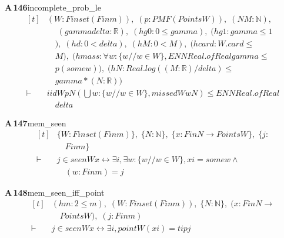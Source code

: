 \documentclass[conference]{IEEEtran}
\theoremstyle{definition}
\newcommand{\lean}[1]{\textsf{\footnotesize #1}}
\begin{document}
\noindent\textbf{A\,146}\quad\lean{incomplete\_prob\_le}
{\footnotesize\[ \begin{aligned}[t]
&(\mathit{W} : \mathit{Finset} (\mathit{Fin} \mathit{m})),\; (\mathit{p} : \mathit{PMF} (\mathit{Points} \mathit{W})),\; (\mathit{N} \mathit{M} : \mathbb{N} ),\\
&\quad \; (\mathit{gamma} \mathit{delta} : \mathbb{R} ),\; (\mathit{hg0} : 0 \leq \mathit{gamma}),\; (\mathit{hg1} : \mathit{gamma} \leq 1\\
&\quad ),\; (\mathit{hd} : 0 < \mathit{delta}),\; (\mathit{hM} : 0 < \mathit{M}),\; (\mathit{hcard} : \mathit{W}.\mathit{card} \leq\\
&\quad \mathit{M}),\; (\mathit{hmass} : \forall \mathit{w} : \{ \mathit{w} // \mathit{w} \in \mathit{W}\} , \mathit{ENNReal}.\mathit{ofReal} \mathit{gamma} \leq\\
&\quad \mathit{p} (\mathit{some} \mathit{w})),\; (\mathit{hN} : \mathit{Real}.\mathit{log} ((\mathit{M}:\mathbb{R} )/\mathit{delta}) \leq\\
&\quad \mathit{gamma}*(\mathit{N}:\mathbb{R} ))\\
\vdash\;&\mathit{iid} \mathit{W} \mathit{p} \mathit{N} (⋃ \mathit{w} : \{ \mathit{w} // \mathit{w} \in \mathit{W}\} , \mathit{missed} \mathit{W} \mathit{w} \mathit{N}) \leq \mathit{ENNReal}.\mathit{ofReal}\\
&\quad \mathit{delta}
\end{aligned} \]}

\noindent\textbf{A\,147}\quad\lean{mem\_seen}
{\footnotesize\[ \begin{aligned}[t]
&\{ \mathit{W} : \mathit{Finset} (\mathit{Fin} \mathit{m})\},\; \{ \mathit{N} : \mathbb{N} \},\; \{ \mathit{x} : \mathit{Fin} \mathit{N} \to \mathit{Points} \mathit{W}\},\; \{ \mathit{j} :\\
&\quad \mathit{Fin} \mathit{m}\}\\
\vdash\;&\mathit{j} \in \mathit{seen} \mathit{W} \mathit{x} \leftrightarrow \exists \mathit{i}, \exists \mathit{w} : \{ \mathit{w} // \mathit{w} \in \mathit{W}\} , \mathit{x} \mathit{i} = \mathit{some} \mathit{w} \wedge\\
&\quad (\mathit{w} : \mathit{Fin} \mathit{m}) = \mathit{j}
\end{aligned} \]}

\noindent\textbf{A\,148}\quad\lean{mem\_seen\_iff\_point}
{\footnotesize\[ \begin{aligned}[t]
&(\mathit{hm} : 2 \leq \mathit{m}),\; (\mathit{W} : \mathit{Finset} (\mathit{Fin} \mathit{m})),\; \{ \mathit{N} : \mathbb{N} \},\; (\mathit{x} : \mathit{Fin} \mathit{N} \to\\
&\quad \mathit{Points} \mathit{W}),\; (\mathit{j} : \mathit{Fin} \mathit{m})\\
\vdash\;&\mathit{j} \in \mathit{seen} \mathit{W} \mathit{x} \leftrightarrow \exists \mathit{i}, \mathit{point} \mathit{W} (\mathit{x} \mathit{i}) = \mathit{tip} \mathit{j}
\end{aligned} \]}
\end{document}
